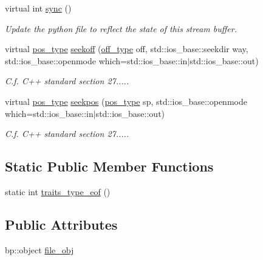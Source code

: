 \begin{DoxyCompactItemize}
virtual int \hyperlink{classecto_1_1py_1_1streambuf_af09b35e1d7da997aacdf99c8802c0fa2}{sync} ()
\begin{DoxyCompactList}\small\item\em Update the python file to reflect the state of this stream buffer. \end{DoxyCompactList}\item 
virtual \hyperlink{classecto_1_1py_1_1streambuf_afdd3f60ff0d0b2f4645742690b7d27dd}{pos\-\_\-type} \hyperlink{classecto_1_1py_1_1streambuf_af30e4b5af87fcc71a7974b1c00721dbb}{seekoff} (\hyperlink{classecto_1_1py_1_1streambuf_aa01772d1599fc51089a209a69fcab7c7}{off\-\_\-type} off, std\-::ios\-\_\-base\-::seekdir way, std\-::ios\-\_\-base\-::openmode which=std\-::ios\-\_\-base\-::in$\vert$std\-::ios\-\_\-base\-::out)
\begin{DoxyCompactList}\small\item\em C.\-f. C++ standard section 27..... \end{DoxyCompactList}\item 
virtual \hyperlink{classecto_1_1py_1_1streambuf_afdd3f60ff0d0b2f4645742690b7d27dd}{pos\-\_\-type} \hyperlink{classecto_1_1py_1_1streambuf_a5763f3ff57fc8044b30a695ad7c403f7}{seekpos} (\hyperlink{classecto_1_1py_1_1streambuf_afdd3f60ff0d0b2f4645742690b7d27dd}{pos\-\_\-type} sp, std\-::ios\-\_\-base\-::openmode which=std\-::ios\-\_\-base\-::in$\vert$std\-::ios\-\_\-base\-::out)
\begin{DoxyCompactList}\small\item\em C.\-f. C++ standard section 27..... \end{DoxyCompactList}\end{DoxyCompactItemize}
\subsection*{Static Public Member Functions}
\begin{DoxyCompactItemize}
\item 
static int \hyperlink{classecto_1_1py_1_1streambuf_ab4446bbe746f4d3713c15492d798872e}{traits\-\_\-type\-\_\-eof} ()
\end{DoxyCompactItemize}
\subsection*{Public Attributes}
\begin{DoxyCompactItemize}
\item 
bp\-::object \hyperlink{classecto_1_1py_1_1streambuf_a63254ed85f60504895f526272e19dd34}{file\-\_\-obj}
\end{DoxyCompactItemize}
